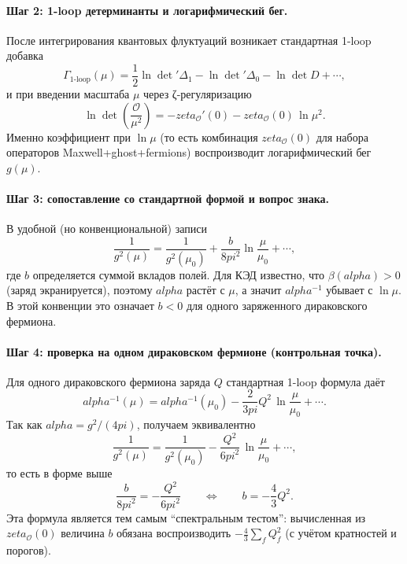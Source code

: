 \documentclass[12pt]{article}
\def\alpha{alpha}%
\def\pi{pi}%
\def\zeta{zeta}%
\begin{document}
\paragraph{Шаг 2: 1-loop детерминанты и логарифмический бег.}
После интегрирования квантовых флуктуаций возникает стандартная 1-loop добавка
\begin{equation}
\Gamma_{\mathrm{1\text{-}loop}}(\mu)
=\frac{1}{2}\ln\det'\Delta_1-\ln\det'\Delta_0-\ln\det D+\cdots,
\end{equation}
и при введении масштаба $\mu$ через ζ-регуляризацию
\begin{equation}
\ln\det\!\left(\frac{\mathcal{O}}{\mu^2}\right)= -\zeta_{\mathcal{O}}'(0)-\zeta_{\mathcal{O}}(0)\,\ln \mu^2.
\end{equation}
Именно коэффициент при $\ln\mu$ (то есть комбинация $\zeta_{\mathcal{O}}(0)$ для набора операторов Maxwell+ghost+fermions) воспроизводит логарифмический бег $g(\mu)$.

\paragraph{Шаг 3: сопоставление со стандартной формой и вопрос знака.}
В удобной (но конвенциональной) записи
\begin{equation}
\frac{1}{g^2(\mu)}
=
\frac{1}{g^2(\mu_0)}
+
\frac{b}{8\pi^2}\ln\frac{\mu}{\mu_0}
+\cdots,
\end{equation}
где $b$ определяется суммой вкладов полей.
Для КЭД известно, что $\beta(\alpha)>0$ (заряд экранируется), поэтому $\alpha$ растёт с $\mu$, а значит $\alpha^{-1}$ убывает с $\ln\mu$.
В этой конвенции это означает $b<0$ для одного заряженного дираковского фермиона.

\paragraph{Шаг 4: проверка на одном дираковском фермионе (контрольная точка).}
Для одного дираковского фермиона заряда $Q$ стандартная 1-loop формула даёт
\begin{equation}
\alpha^{-1}(\mu)=\alpha^{-1}(\mu_0)-\frac{2}{3\pi}Q^2\,\ln\frac{\mu}{\mu_0}+\cdots.
\end{equation}
Так как $\alpha=g^2/(4\pi)$, получаем эквивалентно
\begin{equation}
\frac{1}{g^2(\mu)}=\frac{1}{g^2(\mu_0)}-\frac{Q^2}{6\pi^2}\,\ln\frac{\mu}{\mu_0}+\cdots,
\end{equation}
то есть в форме выше
\begin{equation}
\frac{b}{8\pi^2}=-\frac{Q^2}{6\pi^2}
\qquad\Longleftrightarrow\qquad
b=-\frac{4}{3}Q^2.
\end{equation}
Эта формула является тем самым ``спектральным тестом'': вычисленная из $\zeta_{\mathcal{O}}(0)$ величина $b$ обязана воспроизводить $-\frac{4}{3}\sum_f Q_f^2$ (с учётом кратностей и порогов).
\end{document}
